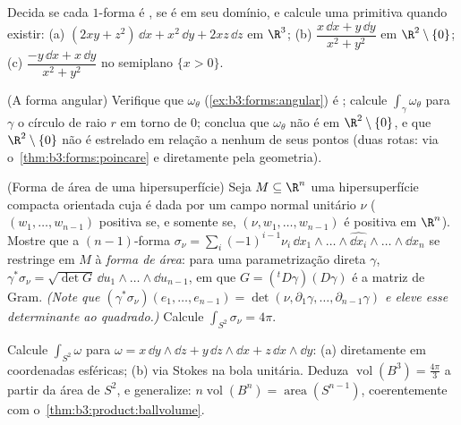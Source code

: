\begin{exercise}[$\star\star$]\label{exo:b3:forms:3}
Decida se cada $1$-forma é , se é  em seu domínio, e
calcule uma primitiva quando existir:
(a) $(2xy + z^2)\,\dd x + x^2\,\dd y + 2xz\,\dd z$ em $\R^3$;
(b) $\dfrac{x\,\dd x + y\,\dd y}{x^2 + y^2}$ em $\R^2\setminus\{0\}$;
(c) $\dfrac{-y\,\dd x + x\,\dd y}{x^2 + y^2}$ no semiplano $\{x > 0\}$.
\end{exercise}

\begin{exercise}[$\star\star$]\label{exo:b3:forms:4}
(A forma angular) Verifique que $\omega_\theta$ (\cref{ex:b3:forms:angular}) é ; calcule
$\int_\gamma\omega_\theta$ para $\gamma$ o círculo de raio $r$ em torno de $0$;
conclua que $\omega_\theta$ não é  em $\R^2\setminus\{0\}$, e que $\R^2\setminus\{0\}$ não é estrelado em
relação a nenhum de seus pontos (duas rotas: via o~\cref{thm:b3:forms:poincare} e
diretamente pela geometria).
\end{exercise}

\begin{exercise}[$\star\star$]\label{exo:b3:forms:5}
(Forma de área de uma hipersuperfície) Seja $M \subseteq \R^n$ uma hipersuperfície
compacta orientada cuja  é dada por um campo normal unitário
$\nu$ ($(w_1, \dots, w_{n-1})$ positiva se, e somente se, $(\nu, w_1, \dots, w_{n-1})$ é positiva em
$\R^n$). Mostre que a $(n-1)$-forma $\sigma_\nu =
\sum_i(-1)^{i-1}\nu_i\,\dd x_1\wedge\dots\wedge\widehat{\dd
x_i}\wedge\dots\wedge\dd x_n$ se restringe em
$M$ à \emph{forma de área}: para uma parametrização direta
$\gamma$, $\gamma^*\sigma_\nu = \sqrt{\det G}\,\dd u_1\wedge\dots
\wedge\dd u_{n-1}$, em que $G = ({}^t D\gamma)(D\gamma)$ é a matriz de Gram. \emph{(Note que
$(\gamma^*\sigma_\nu)(e_1, \dots, e_{n-1}) = \det(\nu,
\partial_1\gamma, \dots, \partial_{n-1}\gamma)$ e eleve esse determinante ao quadrado.)} Calcule $\int_{S^2}\sigma_\nu = 4\pi$.
\end{exercise}

\begin{exercise}[$\star\star$]\label{exo:b3:forms:6}
Calcule $\int_{S^2}\omega$ para $\omega = x\,\dd y\wedge\dd z
+ y\,\dd z\wedge\dd x + z\,\dd x\wedge\dd y$: (a) diretamente em coordenadas esféricas; (b)
via Stokes na bola unitária. Deduza $\operatorname{vol}(B^3) = \frac{4\pi}3$ a partir da área de $S^2$,
e generalize: $n\operatorname{vol}(B^n) = \operatorname{area}(S^{n-1})$, coerentemente com o~\cref{thm:b3:product:ballvolume}.
\end{exercise}

